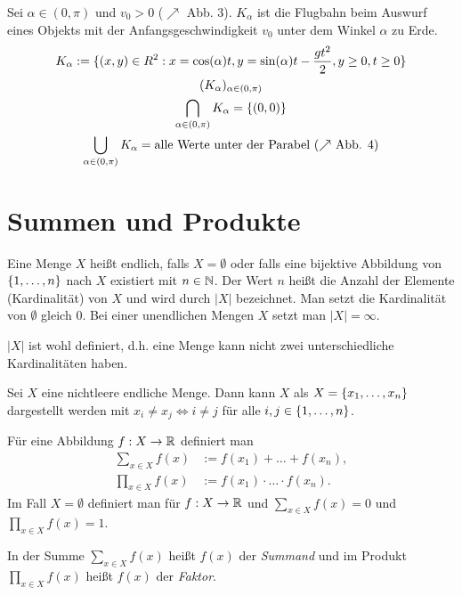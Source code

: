 \begin{bsp}
	Sei $ \alpha \in (0,\pi) $ und $ v_0 > 0 $ ($ \nearrow $ Abb. 3). $ K_\alpha $ ist die Flugbahn beim Auswurf eines Objekts mit der Anfangsgeschwindigkeit $ v_0 $ unter dem Winkel $ \alpha $ zu Erde.
	\begin{gather*}
		K_\alpha := \{ (x,y) \in R^2 : x = \cos(\alpha)t, y = \sin(\alpha)t - \frac{gt^2}{2}, y \geq 0, t \geq 0 \}\\
		( K_\alpha )_{\alpha \in (0,\pi)}\\
		\bigcap_{\alpha \in (0,\pi)} K_\alpha = \{ (0,0) \}\\
		\bigcup_{\alpha \in (0,\pi)} K_\alpha = \text{alle Werte unter der Parabel ($ \nearrow $ Abb. 4)}
	\end{gather*}
\end{bsp}

\section{Summen und Produkte}

\begin{defn} 
Eine Menge $ X $ heißt endlich, falls $ X = \emptyset $ oder falls eine bijektive Abbildung von $ \{ 1,\ldots,n \} $ nach $ X $ existiert mit $ n \in \mathbb{N} $. Der Wert $ n $ heißt die Anzahl der Elemente (Kardinalität) von $ X $ und wird durch $ |X| $ bezeichnet. Man setzt die Kardinalität von $ \emptyset $ gleich 0. Bei einer unendlichen Mengen $X$ setzt man $|X| = \infty$. 
\end{defn} 

\begin{bem}
$ |X| $ ist wohl definiert, d.h. eine Menge kann nicht zwei unterschiedliche Kardinalitäten haben.
\end{bem} 

\begin{defn}
Sei $ X $ eine nichtleere endliche Menge. Dann kann $ X $ als $ X = \{ x_1,\ldots,x_n \} $ dargestellt werden mit  $ x_i \neq x_j \Leftrightarrow i \neq j $ für alle $ i,j \in \{ 1,\ldots,n \} $.

Für eine Abbildung $ f : X \to \mathbb{R} $ definiert man
\begin{align*}
	\sum\limits_{x \in X} f(x) &:= f(x_1) + \ldots + f(x_n),
\\
	\prod\limits_{x \in X} f(x) &:= f(x_1) \cdot \ldots \cdot f(x_n).
\end{align*}
Im Fall $ X = \emptyset $ definiert man für $ f : X \to \mathbb{R} $ und $ \sum\limits_{x \in X} f(x) = 0 $ und $ \prod\limits_{x \in X} f(x) = 1 $.

In der Summe $\sum\limits_{x \in X} f(x)$ heißt $f(x)$ der \emph{Summand} und im Produkt $\prod\limits_{x \in X} f(x)$ heißt $f(x)$ der \emph{Faktor}.  
\end{defn}

